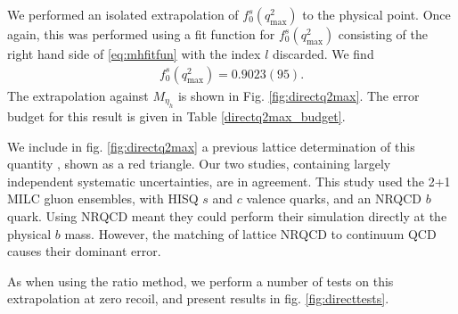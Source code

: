 We performed an isolated extrapolation of $f^s_0(q^2_{\text{max}})$ to the physical point. Once again, this was performed using a fit function for $f^s_0(q^2_{\text{max}})$ consisting of the right hand side of \eqref{eq:mhfitfun} with the index $l$ discarded. We find
\begin{align}
  f_0^s(q^2_{\text{max}}) = 0.9023(95).
  \label{eq:f0s_direct}
\end{align}
The extrapolation against $M_{\eta_h}$ is shown in Fig. \ref{fig:directq2max}. The error budget for this result is given in Table \ref{directq2max_budget}.

We include in fig. \ref{fig:directq2max} a previous lattice determination of this quantity \cite{Monahan:2017uby}, shown as a red triangle. Our two studies, containing largely independent systematic uncertainties, are in agreement. This study used the 2+1 MILC gluon ensembles, with HISQ $s$ and $c$ valence quarks, and an NRQCD $b$ quark. Using NRQCD meant they could perform their simulation directly at the physical $b$ mass. However, the matching of lattice NRQCD to continuum QCD causes their dominant error.

As when using the ratio method, we perform a number of tests on this extrapolation at zero recoil, and present results in fig. \ref{fig:directtests}.

